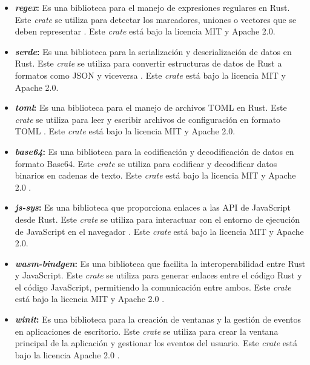 \begin{itemize}
    \item \textbf{\textit{regex}:} Es una biblioteca para el manejo de expresiones regulares en Rust. Este \textit{crate} se utiliza para detectar los marcadores, uniones o vectores que se deben representar \autocite{RegexRust}. Este \textit{crate} está bajo la licencia MIT y Apache 2.0.
    \item \textbf{\textit{serde}:} Es una biblioteca para la serialización y deserialización de datos en Rust. Este \textit{crate} se utiliza para convertir estructuras de datos de Rust a formatos como JSON y viceversa \autocite{SerdeCratesioRust2025}. Este \textit{crate} está bajo la licencia MIT y Apache 2.0. 
    \item \textbf{\textit{toml}:} Es una biblioteca para el manejo de archivos TOML en Rust. Este \textit{crate} se utiliza para leer y escribir archivos de configuración en formato TOML \autocite{TomlCratesioRust2025}. Este \textit{crate} está bajo la licencia MIT y Apache 2.0.
    \item \textbf{\textit{base64}:} Es una biblioteca para la codificación y decodificación de datos en formato Base64. Este \textit{crate} se utiliza para codificar y decodificar datos binarios en cadenas de texto. Este \textit{crate} está bajo la licencia MIT y Apache 2.0 \autocite{Base64CratesioRust2024}.
    \item \textbf{\textit{js-sys}:} Es una biblioteca que proporciona enlaces a las API de JavaScript desde Rust. Este \textit{crate} se utiliza para interactuar con el entorno de ejecución de JavaScript en el navegador \autocite{JssysCratesioRust2025}. Este \textit{crate} está bajo la licencia MIT y Apache 2.0.
    \item \textbf{\textit{wasm-bindgen}:} Es una biblioteca que facilita la interoperabilidad entre Rust y JavaScript. Este \textit{crate} se utiliza para generar enlaces entre el código Rust y el código JavaScript, permitiendo la comunicación entre ambos. Este \textit{crate} está bajo la licencia MIT y Apache 2.0 \autocite{IntroductionWasmbindgenGuide,RustwasmWasmbindgen2025}.
    \item \textbf{\textit{winit}:} Es una biblioteca para la creación de ventanas y la gestión de eventos en aplicaciones de escritorio. Este \textit{crate} se utiliza para crear la ventana principal de la aplicación y gestionar los eventos del usuario. Este \textit{crate} está bajo la licencia Apache 2.0 \autocite{RustwindowingWinit2025}. 
\end{itemize}


